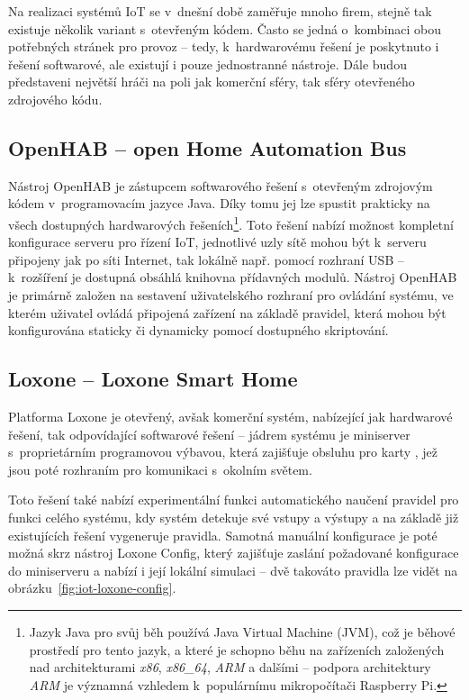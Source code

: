 Na realizaci systémů IoT se v~dnešní době zaměřuje mnoho firem, stejně tak existuje několik variant s~otevřeným kódem.
Často se jedná o~kombinaci obou potřebných stránek pro provoz -- tedy, k~hardwarovému řešení je poskytnuto i řešení
softwarové, ale existují i pouze jednostranné nástroje.
Dále budou představeni největší hráči na poli jak komerční sféry, tak sféry otevřeného zdrojového kódu.

\subsection{OpenHAB -- open Home Automation Bus}\label{subsec:openhab}
Nástroj OpenHAB je zástupcem softwarového řešení s~otevřeným zdrojovým kódem v~programovacím jazyce Java.
Díky tomu jej lze spustit prakticky na všech dostupných hardwarových řešeních\footnote{Jazyk Java pro svůj běh
používá Java Virtual Machine (JVM), což je běhové prostředí pro tento jazyk, a které je schopno běhu na zařízeních
založených nad architekturami \textit{x86}, \textit{x86\_64}, \textit{ARM} a dalšími -- podpora architektury
\textit{ARM} je významná vzhledem k~populárnímu mikropočítači Raspberry Pi.}.
Toto řešení nabízí možnost kompletní konfigurace serveru pro řízení IoT, jednotlivé uzly sítě mohou být k~serveru
připojeny jak po síti Internet, tak lokálně např. pomocí rozhraní USB -- k~rozšíření je dostupná obsáhlá
knihovna přídavných modulů.
Nástroj OpenHAB je primárně založen na sestavení uživatelského rozhraní pro ovládání systému, ve kterém uživatel ovládá
připojená zařízení na základě pravidel, která mohou být konfigurována staticky či dynamicky pomocí dostupného
skriptování.

\subsection{Loxone -- Loxone Smart Home}\label{subsec:loxone}
Platforma Loxone je otevřený, avšak komerční systém, nabízející jak hardwarové řešení, tak odpovídající softwarové
řešení --
jádrem systému je miniserver s~proprietárním programovou výbavou, která zajišťuje obsluhu pro karty , jež jsou poté rozhraním pro komunikaci s~okolním světem.

Toto řešení také nabízí experimentální funkci automatického naučení pravidel pro funkci celého systému, kdy
systém detekuje své vstupy a výstupy a na základě již existujících řešení vygeneruje pravidla.
Samotná manuální konfigurace je poté možná skrz nástroj Loxone Config, který zajišťuje zaslání požadované
konfigurace do miniserveru a nabízí i její lokální simulaci -- dvě takováto pravidla lze vidět na
obrázku~\ref{fig:iot-loxone-config}.

